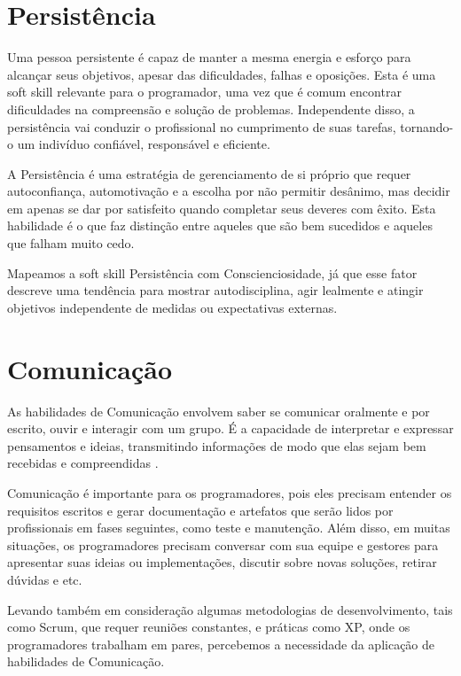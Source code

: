 \section{Persistência}

Uma pessoa persistente é capaz de manter a mesma energia e esforço para alcançar seus objetivos, apesar das dificuldades, falhas e oposições. Esta é uma soft skill relevante para o programador, uma vez que é comum encontrar dificuldades na compreensão e solução de problemas. Independente disso, a persistência vai conduzir o profissional no cumprimento de suas tarefas, tornando-o um indivíduo confiável, responsável e  eficiente.

A Persistência é uma estratégia de gerenciamento de si próprio que requer autoconfiança, automotivação e a escolha por não permitir desânimo, mas decidir em apenas se dar por satisfeito quando completar seus deveres com êxito. Esta habilidade é o que faz distinção entre aqueles que são bem sucedidos e aqueles que falham muito cedo.

Mapeamos a soft skill Persistência com Conscienciosidade, já que esse fator descreve uma tendência para mostrar autodisciplina, agir lealmente e atingir objetivos independente de medidas ou expectativas externas.

\section{Comunicação}

As habilidades de Comunicação envolvem saber se comunicar oralmente e por escrito, ouvir e interagir com um grupo. É a capacidade de  interpretar e expressar pensamentos e ideias, transmitindo informações de modo que elas sejam bem recebidas e compreendidas \cite{ahmed:12}.

Comunicação é importante para os programadores, pois eles precisam entender os requisitos escritos e gerar documentação e artefatos que serão lidos por profissionais em fases seguintes, como teste e manutenção. Além disso, em muitas situações, os programadores precisam conversar com sua equipe e gestores para apresentar suas ideias ou implementações, discutir sobre novas soluções, retirar dúvidas e etc.

Levando também em consideração algumas metodologias de desenvolvimento, tais como Scrum, que requer reuniões constantes, e práticas como XP, onde os programadores trabalham em pares, percebemos a necessidade da aplicação de habilidades de Comunicação. 

